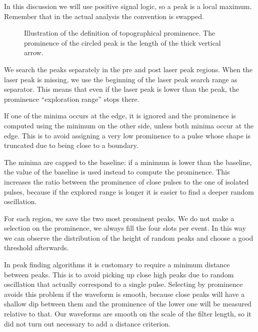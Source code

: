 In this discussion we will use positive signal logic, so a peak is a local
maximum. Remember that in the actual analysis the convention is swapped.

\begin{figure}
    
    
    \caption{\label{fig:prominence} Illustration of the definition of
    topographical prominence. The prominence of the circled peak is the length
    of the thick vertical arrow.}
    
\end{figure}

We search the peaks separately in the pre and post laser peak regions. When the
laser peak is missing, we use the beginning of the laser peak search range as
separator. This means that even if the laser peak is lower than the peak, the
prominence ``exploration range'' stops there.

If one of the minima occurs at the edge, it is ignored and the prominence is
computed using the minimum on the other side, unless both minima occur at the
edge. This is to avoid assigning a very low prominence to a pulse whose shape
is truncated due to being close to a boundary.

The minima are capped to the baseline: if a minimum is lower than the baseline,
the value of the baseline is used instead to compute the prominence. This
increases the ratio between the prominence of close pulses to the one of
isolated pulses, because if the explored range is longer it is easier to find a
deeper random oscillation.

For each region, we save the two most prominent peaks. We do not make a
selection on the prominence, we always fill the four slots per event. In this
way we can observe the distribution of the height of random peaks and choose
a good threshold afterwards.

In peak finding algorithms it is customary to require a minimum distance
between peaks. This is to avoid picking up close high peaks due to random
oscillation that actually correspond to a single pulse. Selecting by prominence
avoids this problem if the waveform is smooth, because close peaks will have a
shallow dip between them and the prominence of the lower one will be measured
relative to that. Our waveforms are smooth on the scale of the filter length,
so it did not turn out necessary to add a distance criterion.

